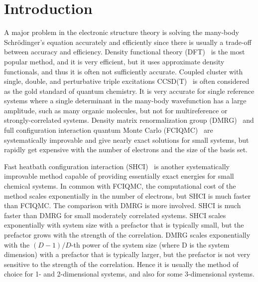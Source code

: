 \documentclass[phd,tocprelim]{cornell}
\begin{document}
\normalspacing \setcounter{page}{1} 
\pagestyle{cornell} \addtolength{\parskip}{0.5\baselineskip}

\chapter{Introduction}
\label{ch:intro}
A major problem in the electronic structure theory is solving the many-body Schr\"{o}dinger's equation accurately and efficiently since there is usually a trade-off between accuracy and efficiency.
Density functional theory (DFT)~\cite{ParYan-BOOK-89,DreGro-BOOK-90,kohn1999nobel} is the most popular method, and it is very efficient,
but it uses approximate density functionals, and thus it is often not sufficiently accurate.
Coupled cluster with single, double, and perturbative triple excitations CCSD(T)~\cite{raghavachari1989fifth} is often considered as the gold standard of quantum chemistry.
It is very accurate for single reference systems where a single determinant in the many-body wavefunction has a large amplitude, such as many organic molecules, but not for multireference or strongly-correlated systems.
Density matrix renormalization group (DMRG)~\cite{white1993density,white1999ab,chan2002highly,chan2011density,ShaCha-JCP-12,olivares2015ab,schollwock2005density,GuoLiCha-JCTC-18}
and full configuration interaction quantum Monte Carlo (FCIQMC)~\cite{BooThoAla-JCP-09,CleBooAla-JCP-10,PetHolChaNigUmr-PRL-12,BooGruKreAla-Nat-13,HolChaUmr-JCTC-16}
are
systematically improvable and
give nearly exact solutions for small systems,
but rapidly get expensive with the number of electrons and the size of the basis set.

Fast heatbath configuration interaction (SHCI)~\cite{HolTubUmr-JCTC-16,ShaHolJeaAlaUmr-JCTC-17,HolUmrSha-JCP-17,SmiMusHolSha-JCTC-17,MusSha-JCTC-17,ChiHolOttUmrShaZim-JPCA-18,LiOttHolShaUmr-JCP-18}
is another systematically improvable method capable of providing essentially exact energies for small chemical systems.
In common with FCIQMC, the computational cost of the method scales exponentially in the number of electrons, but SHCI is much faster than FCIQMC.
The comparison with DMRG is more involved.
SHCI is much faster than DMRG for small moderately correlated systems.
SHCI scales exponentially with system size with a prefactor that is typically small, but the prefactor grows with
the strength of the correlation.
DMRG scales exponentially with the $(D-1)/D$-th power of the system size (where D is the system dimension) with a prefactor that is typically larger,
but the prefactor is not very sensitive to the strength of the correlation.
Hence it is usually the method of choice for 1- and 2-dimensional systems, and also for some 3-dimensional systems.
\end{document}
